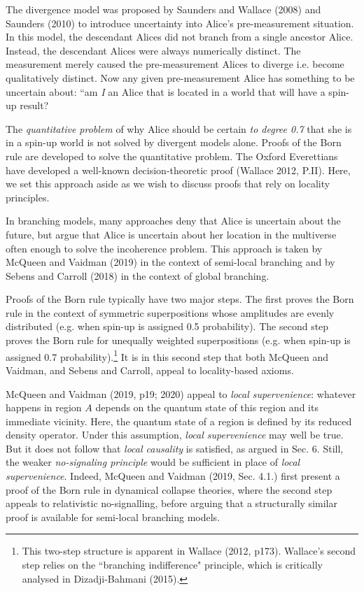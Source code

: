 \documentclass[12pt]{article}
\begin{document}
The divergence model was proposed by Saunders and Wallace (2008) and Saunders (2010) to introduce uncertainty into Alice's pre-measurement situation. In this model, the descendant Alices did not branch from a single ancestor Alice. Instead, the descendant Alices were always numerically distinct. The measurement merely caused the pre-measurement Alices to diverge i.e. become qualitatively distinct. Now any given pre-measurement Alice has something to be uncertain about: ``am \textit{I} an Alice that is located in a world that will have a spin-up result? 

The \textit{quantitative problem} of why Alice should be certain \textit{to degree 0.7} that she is in a spin-up world is not solved by divergent models alone. Proofs of the Born rule are developed to solve the quantitative problem. The Oxford Everettians have developed a well-known decision-theoretic proof (Wallace 2012, P.II). Here, we set this approach aside as we wish to discuss proofs that rely on locality principles.  

In branching models, many approaches deny that Alice is uncertain about the future, but argue that Alice is uncertain about her location in the multiverse often enough to solve the incoherence problem. This approach is taken by McQueen and Vaidman (2019) in the context of semi-local branching and by Sebens and Carroll (2018) in the context of global branching.

Proofs of the Born rule typically have two major steps. The first proves the Born rule in the context of symmetric superpositions whose amplitudes are evenly distributed (e.g. when spin-up is assigned 0.5 probability). The second step proves the Born rule for unequally weighted superpositions (e.g. when spin-up is assigned 0.7 probability).\footnote{This two-step structure is apparent in Wallace (2012, p173). Wallace's second step relies on the ``branching indifference" principle, which is critically analysed in Dizadji-Bahmani (2015).} It is in this second step that both McQueen and Vaidman, and Sebens and Carroll, appeal to locality-based axioms. 

McQueen and Vaidman (2019, p19; 2020) appeal to \textit{local supervenience}: whatever happens in region $A$ depends on the quantum state of this region and its immediate vicinity. Here, the quantum state of a region is defined by its reduced density operator. Under this assumption, \textit{local supervenience} may well be true. But it does not follow that \textit{local causality} is satisfied, as argued in Sec. 6. Still, the weaker \textit{no-signaling principle} would be sufficient in place of \textit{local supervenience}. Indeed, McQueen and Vaidman (2019, Sec. 4.1.) first present a proof of the Born rule in dynamical collapse theories, where the second step appeals to relativistic no-signalling, before arguing that a structurally similar proof is available for semi-local branching models.
\end{document}
